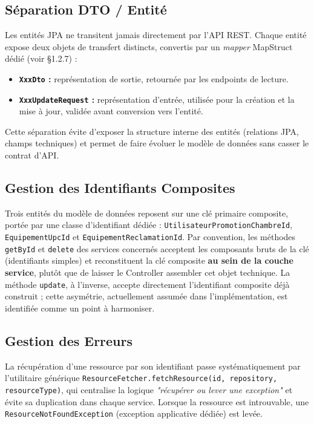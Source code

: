 \documentclass[a4paper,12pt]{article}
\begin{document}
\subsection{Séparation DTO / Entité}
Les entités JPA ne transitent jamais directement par l'API REST. Chaque entité expose deux objets de transfert distincts, convertis par un \textit{mapper} MapStruct dédié (voir \S1.2.7) :
\begin{itemize}[label=$\bullet$]
    \item \textbf{\texttt{XxxDto} :} représentation de sortie, retournée par les endpoints de lecture.
    \item \textbf{\texttt{XxxUpdateRequest} :} représentation d'entrée, utilisée pour la création et la mise à jour, validée avant conversion vers l'entité.
\end{itemize}
Cette séparation évite d'exposer la structure interne des entités (relations JPA, champs techniques) et permet de faire évoluer le modèle de données sans casser le contrat d'API.

\subsection{Gestion des Identifiants Composites}
Trois entités du modèle de données reposent sur une clé primaire composite, portée par une classe d'identifiant dédiée : \texttt{UtilisateurPromotionChambreId}, \texttt{EquipementUpcId} et \texttt{EquipementReclamationId}. Par convention, les méthodes \texttt{getById} et \texttt{delete} des services concernés acceptent les composants bruts de la clé (identifiants simples) et reconstituent la clé composite \textbf{au sein de la couche service}, plutôt que de laisser le Controller assembler cet objet technique. La méthode \texttt{update}, à l'inverse, accepte directement l'identifiant composite déjà construit ; cette asymétrie, actuellement assumée dans l'implémentation, est identifiée comme un point à harmoniser.

\subsection{Gestion des Erreurs}
La récupération d'une ressource par son identifiant passe systématiquement par l'utilitaire générique \texttt{ResourceFetcher.fetchResource(id, repository, resourceType)}, qui centralise la logique \textit{"récupérer ou lever une exception"} et évite sa duplication dans chaque service. Lorsque la ressource est introuvable, une \texttt{ResourceNotFoundException} (exception applicative dédiée) est levée.
\end{document}
